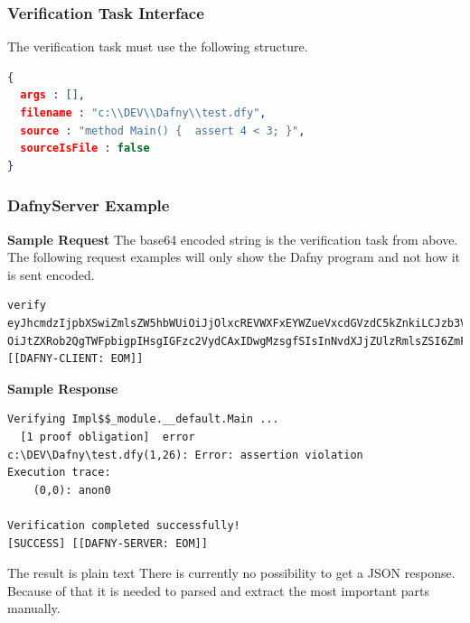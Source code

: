 \subsubsection{Verification Task Interface}\label{verificationtaskinterface}
The verification task must use the following structure. \newline
\begin{lstlisting}[language=json,firstnumber=1]
{
  args : [],
  filename : "c:\\DEV\\Dafny\\test.dfy",
  source : "method Main() {  assert 4 < 3; }",
  sourceIsFile : false
}
\end{lstlisting}
\subsubsection{DafnyServer Example}
\textbf{Sample Request}
The base64 encoded string is the verification task from above. 
The following request examples will only show the Dafny program and not how it is sent encoded. 
\begin{lstlisting}[language={},backgroundcolor=\color{background},basicstyle=\scriptsize\ttfamily]
verify
eyJhcmdzIjpbXSwiZmlsZW5hbWUiOiJjOlxcREVWXFxEYWZueVxcdGVzdC5kZnkiLCJzb3VyY2Ui
OiJtZXRob2QgTWFpbigpIHsgIGFzc2VydCAxIDwgMzsgfSIsInNvdXJjZUlzRmlsZSI6ZmFsc2V9
[[DAFNY-CLIENT: EOM]]
\end{lstlisting}
\textbf{Sample Response}
\begin{lstlisting}[language={},backgroundcolor=\color{background},basicstyle=\scriptsize\ttfamily]
Verifying Impl$$_module.__default.Main ...
  [1 proof obligation]  error
c:\DEV\Dafny\test.dfy(1,26): Error: assertion violation
Execution trace:
    (0,0): anon0

Verification completed successfully!
[SUCCESS] [[DAFNY-SERVER: EOM]]
\end{lstlisting}
The result is plain text There is currently no possibility to get a JSON response. Because of that it is needed to parsed and extract the most important parts manually. 
